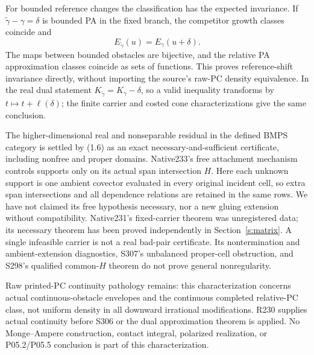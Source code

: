 \documentclass[11pt]{article}
\begin{document}
For bounded reference changes the classification has the expected invariance. If $\widetilde\gamma-\gamma=\delta$ is bounded PA in the fixed branch, the competitor growth classes coincide and
\[
 E_{\widetilde\gamma}(u)=E_\gamma(u+\delta).
\]
The maps between bounded obstacles are bijective, and the relative PA approximation classes coincide as sets of functions. This proves reference-shift invariance directly, without importing the source's raw-PC density equivalence. In the real dual statement $K_{\widetilde\gamma}=K_\gamma-\delta$, so a valid inequality transforms by $t\mapsto t+\ell(\delta)$; the finite carrier and costed cone characterizations give the same conclusion.

The higher-dimensional real and nonseparable residual in the defined BMPS category is settled by (1.6) as an exact necessary-and-sufficient certificate, including nonfree and proper domains. Native233's free attachment mechanism controls supports only on its actual span intersection $H$. Here each unknown support is one ambient covector evaluated in every original incident cell, so extra span intersections and all dependence relations are retained in the same rows. We have not claimed its free hypothesis necessary, nor a new gluing extension without compatibility. Native231's fixed-carrier theorem was unregistered data; its necessary theorem has been proved independently in Section~\ref{s:matrix}. A single infeasible carrier is not a real bad-pair certificate. Its nontermination and ambient-extension diagnostics, S307's unbalanced proper-cell obstruction, and S298's qualified common-$H$ theorem do not prove general nonregularity.

Raw printed-PC continuity pathology remains: this characterization concerns actual continuous-obstacle envelopes and the continuous completed relative-PC class, not uniform density in all downward irrational modifications. R230 supplies actual continuity before S306 or the dual approximation theorem is applied. No Monge--Ampere construction, contact integral, polarized realization, or P05.2/P05.5 conclusion is part of this characterization.
\end{document}
